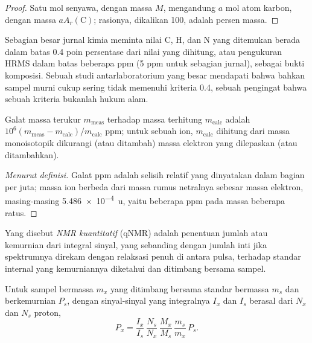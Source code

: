 \begin{proof}
Satu mol senyawa, dengan massa $M$, mengandung $a$ mol atom karbon, dengan massa $aA_r(\mathrm C)$;
rasionya, dikalikan 100, adalah persen massa.
\end{proof}

Sebagian besar jurnal kimia meminta nilai C, H, dan N yang ditemukan berada dalam batas 0.4 poin
persentase dari nilai yang dihitung, atau pengukuran HRMS dalam batas beberapa ppm (5 ppm
untuk sebagian jurnal), sebagai bukti komposisi. Sebuah studi antarlaboratorium yang besar mendapati bahwa
bahkan sampel murni cukup sering tidak memenuhi kriteria 0.4, sebuah pengingat bahwa sebuah
kriteria bukanlah hukum alam.

\begin{proposition}\label{prop:b3:lab-techniques-3:ppm-error}
Galat massa terukur $m_{\mathrm{meas}}$ terhadap massa terhitung $m_{\mathrm{calc}}$ adalah
$10^6(m_{\mathrm{meas}} - m_{\mathrm{calc}})/m_{\mathrm{calc}}$ ppm; untuk sebuah ion, $m_{\mathrm{calc}}$ dihitung dari massa monoisotopik dikurangi (atau ditambah)
massa elektron yang dilepaskan (atau ditambahkan).
\end{proposition}

\begin{proof}[Menurut definisi]
Galat ppm adalah selisih relatif yang dinyatakan dalam bagian per juta; massa
ion berbeda dari massa rumus netralnya sebesar massa elektron, masing-masing \qty{5.486e-4}{u}, yaitu
beberapa ppm pada massa beberapa ratus.
\end{proof}

\begin{definition}\label{def:b3:lab-techniques-3:qnmr}
Yang disebut \emph{NMR kuantitatif} (qNMR) adalah penentuan jumlah atau
kemurnian dari integral sinyal, yang sebanding dengan jumlah inti
jika spektrumnya direkam dengan relaksasi penuh di antara pulsa, terhadap
standar internal yang kemurniannya diketahui dan ditimbang bersama sampel.
\end{definition}

\begin{proposition}\label{prop:b3:lab-techniques-3:qnmr}
Untuk sampel bermassa $m_x$ yang ditimbang bersama standar bermassa $m_s$ dan berkemurnian $P_s$, dengan sinyal-sinyal
yang integralnya $I_x$ dan $I_s$ berasal dari $N_x$ dan $N_s$ proton,
\[
  P_x = \frac{I_x}{I_s}\,\frac{N_s}{N_x}\,\frac{M_x}{M_s}\,\frac{m_s}{m_x}\,P_s.
\]
\end{proposition}


